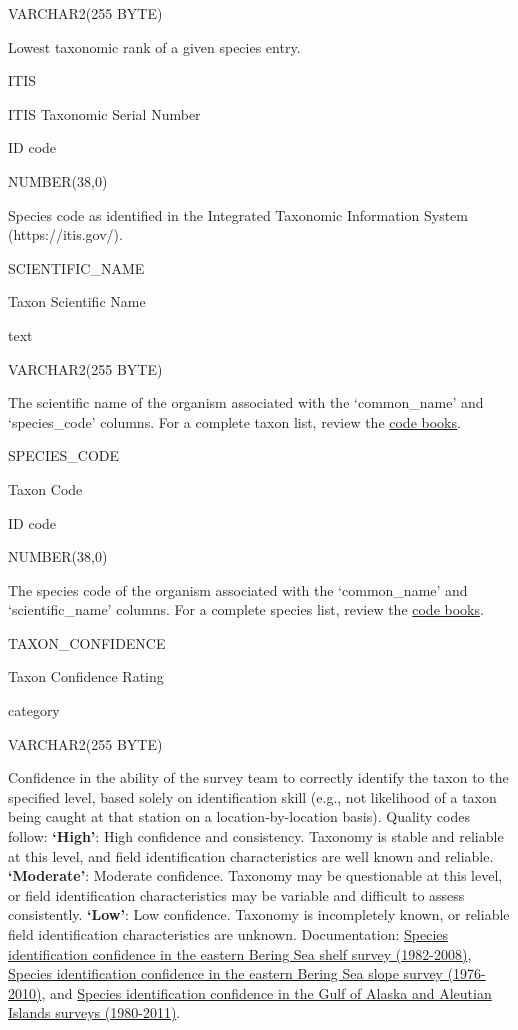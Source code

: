\documentclass[
  letterpaper,
  oneside,
  open=any]{scrbook}
\begin{document}
VARCHAR2(255 BYTE)

Lowest taxonomic rank of a given species entry.

ITIS

ITIS Taxonomic Serial Number

ID code

NUMBER(38,0)

Species code as identified in the Integrated Taxonomic Information
System (https://itis.gov/).

SCIENTIFIC\_NAME

Taxon Scientific Name

text

VARCHAR2(255 BYTE)

The scientific name of the organism associated with the `common\_name'
and `species\_code' columns. For a complete taxon list, review the
\href{https://www.fisheries.noaa.gov/resource/document/groundfish-survey-species-code-manual-and-data-codes-manual}{code
books}.

SPECIES\_CODE

Taxon Code

ID code

NUMBER(38,0)

The species code of the organism associated with the `common\_name' and
`scientific\_name' columns. For a complete species list, review the
\href{https://www.fisheries.noaa.gov/resource/document/groundfish-survey-species-code-manual-and-data-codes-manual}{code
books}.

TAXON\_CONFIDENCE

Taxon Confidence Rating

category

VARCHAR2(255 BYTE)

Confidence in the ability of the survey team to correctly identify the
taxon to the specified level, based solely on identification skill
(e.g., not likelihood of a taxon being caught at that station on a
location-by-location basis). Quality codes follow: \textbf{`High'}: High
confidence and consistency. Taxonomy is stable and reliable at this
level, and field identification characteristics are well known and
reliable. \textbf{`Moderate'}: Moderate confidence. Taxonomy may be
questionable at this level, or field identification characteristics may
be variable and difficult to assess consistently. \textbf{`Low'}: Low
confidence. Taxonomy is incompletely known, or reliable field
identification characteristics are unknown. Documentation:
\href{http://apps-afsc.fisheries.noaa.gov/Publications/ProcRpt/PR2009-04.pdf}{Species
identification confidence in the eastern Bering Sea shelf survey
(1982-2008)},
\href{http://apps-afsc.fisheries.noaa.gov/Publications/ProcRpt/PR2014-05.pdf}{Species
identification confidence in the eastern Bering Sea slope survey
(1976-2010)}, and
\href{http://apps-afsc.fisheries.noaa.gov/Publications/ProcRpt/PR2014-01.pdf}{Species
identification confidence in the Gulf of Alaska and Aleutian Islands
surveys (1980-2011)}.
\end{document}
